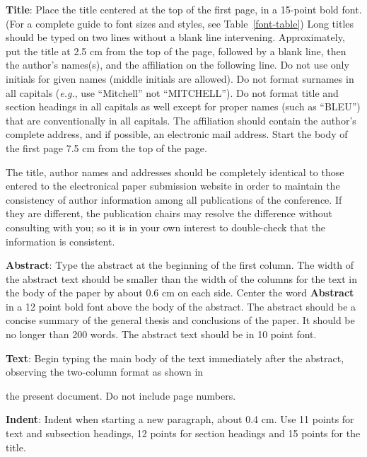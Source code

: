 \documentclass[11pt,a4paper]{article}
\begin{document}
{\bf Title}: Place the title centered at the top of the first page, in
a 15-point bold font. (For a complete guide to font sizes and styles,
see Table~\ref{font-table}) Long titles should be typed on two lines
without a blank line intervening. Approximately, put the title at 2.5
cm from the top of the page, followed by a blank line, then the
author's names(s), and the affiliation on the following line. Do not
use only initials for given names (middle initials are allowed). Do
not format surnames in all capitals ({\em e.g.}, use ``Mitchell'' not
``MITCHELL'').  Do not format title and section headings in all
capitals as well except for proper names (such as ``BLEU'') that are
conventionally in all capitals.  The affiliation should contain the
author's complete address, and if possible, an electronic mail
address. Start the body of the first page 7.5 cm from the top of the
page.

The title, author names and addresses should be completely identical
to those entered to the electronical paper submission website in order
to maintain the consistency of author information among all
publications of the conference. If they are different, the publication
chairs may resolve the difference without consulting with you; so it
is in your own interest to double-check that the information is
consistent.

{\bf Abstract}: Type the abstract at the beginning of the first
column. The width of the abstract text should be smaller than the
width of the columns for the text in the body of the paper by about
0.6 cm on each side. Center the word {\bf Abstract} in a 12 point bold
font above the body of the abstract. The abstract should be a concise
summary of the general thesis and conclusions of the paper. It should
be no longer than 200 words. The abstract text should be in 10 point font.

{\bf Text}: Begin typing the main body of the text immediately after
the abstract, observing the two-column format as shown in 


the present document. Do not include page numbers.

{\bf Indent}: Indent when starting a new paragraph, about 0.4 cm. Use 11 points for text and subsection headings, 12 points for section headings and 15 points for the title. 
\end{document}
